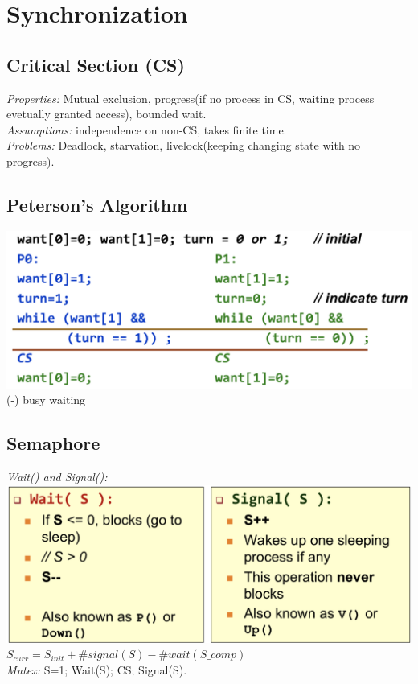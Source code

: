 \section{Synchronization}
\subsection*{Critical Section (CS)}
\emph{Properties:} Mutual exclusion, progress(if no process in CS, waiting process evetually granted access), bounded wait.\\
\emph{Assumptions:} independence on non-CS, takes finite time.\\
\emph{Problems:} Deadlock, starvation, livelock(keeping changing state with no progress).

\subsection*{Peterson's Algorithm}
\includegraphics[width=0.6\linewidth]{images/peterson-algo} (-) busy waiting
 
\subsection*{Semaphore}
\emph{Wait() and Signal():}\\
\includegraphics[width=0.75\linewidth]{images/wait-and-signal}\\
$S_{curr}=S_{init}+\#signal(S)-\#wait(S\_comp)$\\
\emph{Mutex:} S=1; Wait(S); CS; Signal(S).

